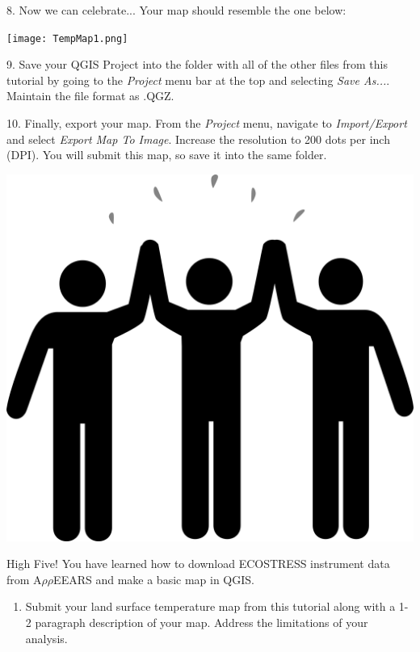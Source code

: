 \documentclass[oneside,a4paper,11pt,explicit]{book}
\begin{document}
\vspace{1em}

8. Now we can celebrate... Your map should resemble the one below:

\vspace{1em}

\centerline{\texttt{[image: TempMap1.png]}}

\vspace{1em}


\newpage

9. Save your QGIS Project into the folder with all of the other files from this tutorial by going to the \textit{Project} menu bar at the top and selecting \textit{Save As...}. Maintain the file format as .QGZ.

10. Finally, export your map. From the \textit{Project} menu, navigate to \textit{Import/Export} and select \textit{Export Map To Image}. Increase the resolution to 200 dots per inch (DPI). You will submit this map, so save it into the same folder. 

\vspace{1em}

\centerline{\includegraphics[width=.5\textwidth]{high_five.png}}

\vspace{1em}

High Five! You have learned how to download ECOSTRESS instrument data from A$\rho\rho$EEARS and make a basic map in QGIS.

\begin{tcolorbox}[colback=yellow!5!white,colframe=IceCreamOrbit,title= \vspace{.2em} \Large Map of the Week Assignments]
	\large
	\begin{enumerate}
		\item Submit your land surface temperature map from this tutorial along with a 1-2 paragraph description of your map. Address the limitations of your analysis.
	\end{enumerate}
\end{tcolorbox}
\end{document}
